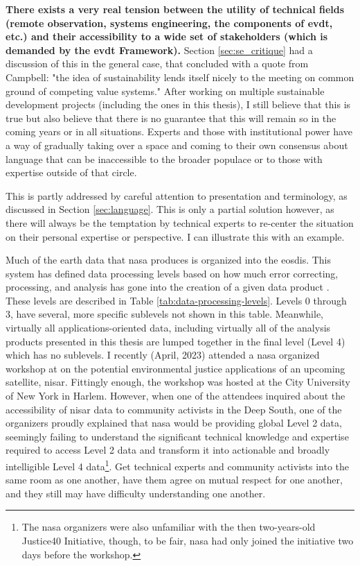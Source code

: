 \textbf{There exists a very real tension between the utility of technical fields (remote observation, systems engineering, the components of \ac{evdt}, etc.) and their accessibility to a wide set of stakeholders (which is demanded by the \ac{evdt} Framework).} Section \ref{sec:se_critique} had a discussion of this in the general case, that concluded with a quote from Campbell: "the idea of sustainability lends itself nicely to the meeting on common ground of competing value systems." After working on multiple sustainable development projects (including the ones in this thesis), I still believe that this is true but also believe that there is no guarantee that this will remain so in the coming years or in all situations. Experts and those with institutional power have a way of gradually taking over a space and coming to their own consensus about language that can be inaccessible to the broader populace or to those with expertise outside of that circle.

This is partly addressed by careful attention to presentation and terminology, as discussed in Section \ref{sec:language}. This is only a partial solution however, as there will always be the temptation by technical experts to re-center the situation on their personal expertise or perspective. I can illustrate this with an example.

Much of the earth data that \ac{nasa} produces is organized into the \ac{eosdis}. This system has defined data processing levels based on how much error correcting, processing, and analysis has gone into the creation of a given data product \cite{earthsciencedatasystemsDataProcessingLevels2016}. These levels are described in Table \ref{tab:data-processing-levels}. Levels 0 through 3, have several, more specific sublevels not shown in this table. Meanwhile, virtually all applications-oriented data, including virtually all of the analysis products presented in this thesis are lumped together in the final level (Level 4) which has no sublevels. I recently (April, 2023) attended a \ac{nasa} organized workshop at on the potential environmental justice applications of an upcoming satellite, \ac{nisar}. Fittingly enough, the workshop was hosted at the City University of New York in Harlem. However, when one of the attendees inquired about the accessibility of \ac{nisar} data to community activists in the Deep South, one of the organizers proudly explained that \ac{nasa} would be providing global Level 2 data, seemingly failing to understand the significant technical knowledge and expertise required to access Level 2 data and transform it into actionable and broadly intelligible Level 4 data\footnote{The \ac{nasa} organizers were also unfamiliar with the then two-years-old Justice40 Initiative, though, to be fair, \ac{nasa} had only joined the initiative two days before the workshop.}. Get technical experts and community activists into the same room as one another, have them agree on mutual respect for one another, and they still may have difficulty understanding one another.

